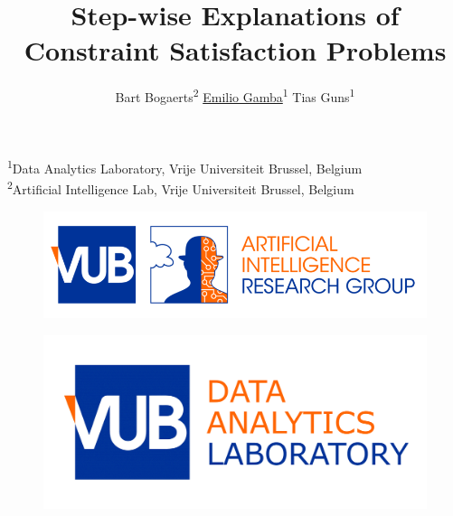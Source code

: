 \documentclass[handout]{beamer}
\title{Step-wise Explanations of Constraint Satisfaction Problems}
\author{ Bart Bogaerts\textsuperscript{2}  \hspace{0.5cm}\underline{Emilio Gamba}\textsuperscript{1} \hspace{0.5cm} Tias Guns\textsuperscript{1}}
\date{}
\begin{document}
\begin{frame}
    \maketitle
    \vspace{-2.5cm}
    \begin{center}
        {\small\textsuperscript{1}Data Analytics Laboratory, Vrije Universiteit Brussel, Belgium\\
            \textsuperscript{2}Artificial Intelligence Lab, Vrije Universiteit Brussel, Belgium}
    \end{center}

    \begin{minipage}[t]{0.48\linewidth}
        \centering
        \vspace{0.1cm}
        \begin{figure}[h]
            \includegraphics[width=\textwidth]{VUB-AI_RGB-1-800x223.png}
            \label{vub-logo}
        \end{figure}
    \end{minipage}\hfill
    \begin{minipage}[t]{0.48\linewidth}
        \centering
        \begin{figure}[h]
            \includegraphics[width=.68\textwidth]{figures/datalab}
            \label{vub-logo}
        \end{figure}

    \end{minipage}

\end{frame}
\end{document}
